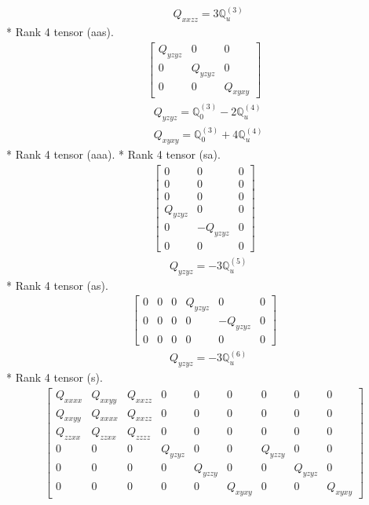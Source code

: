 \documentclass[fleqn,8pt,landscape]{jsarticle}
\begin{document}
\begin{align*}
& Q_{xxzz} = 3 \mathbb{Q}_{u}^{(3)}
\end{align*}
* Rank 4 tensor (aas).
\begin{align*}
\begin{bmatrix} Q_{yzyz} & 0 & 0 \\ 0 & Q_{yzyz} & 0 \\ 0 & 0 & Q_{xyxy} \end{bmatrix}
\end{align*}
\begin{align*}
& Q_{yzyz} = \mathbb{Q}_{0}^{(3)} - 2 \mathbb{Q}_{u}^{(4)} \\
& Q_{xyxy} = \mathbb{Q}_{0}^{(3)} + 4 \mathbb{Q}_{u}^{(4)}
\end{align*}
* Rank 4 tensor (aaa).
* Rank 4 tensor (sa).
\begin{align*}
\begin{bmatrix} 0 & 0 & 0 \\ 0 & 0 & 0 \\ 0 & 0 & 0 \\ Q_{yzyz} & 0 & 0 \\ 0 & - Q_{yzyz} & 0 \\ 0 & 0 & 0 \end{bmatrix}
\end{align*}
\begin{align*}
& Q_{yzyz} = - 3 \mathbb{Q}_{u}^{(5)}
\end{align*}
* Rank 4 tensor (as).
\begin{align*}
\begin{bmatrix} 0 & 0 & 0 & Q_{yzyz} & 0 & 0 \\ 0 & 0 & 0 & 0 & - Q_{yzyz} & 0 \\ 0 & 0 & 0 & 0 & 0 & 0 \end{bmatrix}
\end{align*}
\begin{align*}
& Q_{yzyz} = - 3 \mathbb{Q}_{u}^{(6)}
\end{align*}
* Rank 4 tensor (s).
\begin{align*}
\begin{bmatrix} Q_{xxxx} & Q_{xxyy} & Q_{xxzz} & 0 & 0 & 0 & 0 & 0 & 0 \\ Q_{xxyy} & Q_{xxxx} & Q_{xxzz} & 0 & 0 & 0 & 0 & 0 & 0 \\ Q_{zzxx} & Q_{zzxx} & Q_{zzzz} & 0 & 0 & 0 & 0 & 0 & 0 \\ 0 & 0 & 0 & Q_{yzyz} & 0 & 0 & Q_{yzzy} & 0 & 0 \\ 0 & 0 & 0 & 0 & Q_{yzzy} & 0 & 0 & Q_{yzyz} & 0 \\ 0 & 0 & 0 & 0 & 0 & Q_{xyxy} & 0 & 0 & Q_{xyxy} \end{bmatrix}
\end{align*}
\end{document}
